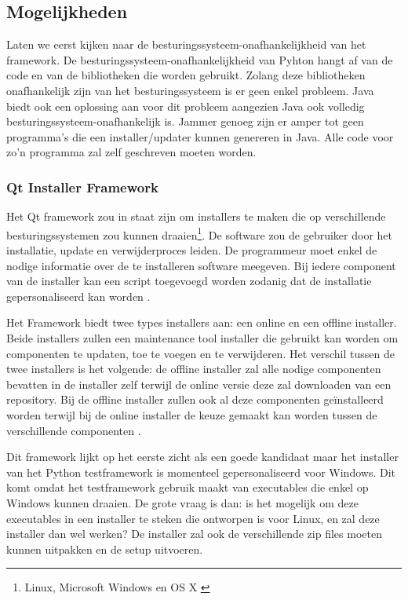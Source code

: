 \documentclass{article}
\begin{document}
\subsection{Mogelijkheden}\label{section:mogelijkheden}
Laten we eerst kijken naar de besturingssysteem-onafhankelijkheid van het framework.
De besturingssysteem-onafhankelijkheid van Pyhton hangt af van de code en van de bibliotheken die worden gebruikt.
Zolang deze bibliotheken onafhankelijk zijn van het besturingssysteem is er geen enkel probleem.
Java biedt ook een oplossing aan voor dit probleem aangezien Java ook volledig besturingssysteem-onafhankelijk is.
Jammer genoeg zijn er amper tot geen programma's die een installer/updater kunnen genereren in Java.
Alle code voor zo'n programma zal zelf geschreven moeten worden.

\subsubsection{Qt Installer Framework \citep{qtDoc}}
Het Qt framework zou in staat zijn om installers te maken die op verschillende besturingssystemen zou kunnen draaien\footnote{Linux, Microsoft Windows en OS X \citep{qtOverview}}.
De software zou de gebruiker door het installatie, update en verwijderproces leiden.
De programmeur moet enkel de nodige informatie over de te installeren software meegeven.
Bij iedere component van de installer kan een script toegevoegd worden zodanig dat de installatie gepersonaliseerd kan worden \citep{qtDocScript}.

Het Framework biedt twee types installers aan: een online en een offline installer.
Beide installers zullen een maintenance tool installer die gebruikt kan worden om componenten te updaten, toe te voegen en te verwijderen.
Het verschil tussen de twee installers is het volgende: de offline installer zal alle nodige componenten bevatten in de installer zelf terwijl de online versie deze zal downloaden van een repository.
Bij de offline installer zullen ook al deze componenten ge\"installeerd worden terwijl bij de online installer de keuze gemaakt kan worden tussen de verschillende componenten \citep{qtOverview}.

Dit framework lijkt op het eerste zicht als een goede kandidaat maar het installer van het Python testframework is momenteel gepersonaliseerd voor Windows.
Dit komt omdat het testframework gebruik maakt van executables die enkel op Windows kunnen draaien.
De grote vraag is dan: is het mogelijk om deze executables in een installer te steken die ontworpen is voor Linux, en zal deze installer dan wel werken?
De installer zal ook de verschillende zip files moeten kunnen uitpakken en de setup uitvoeren.
\end{document}
